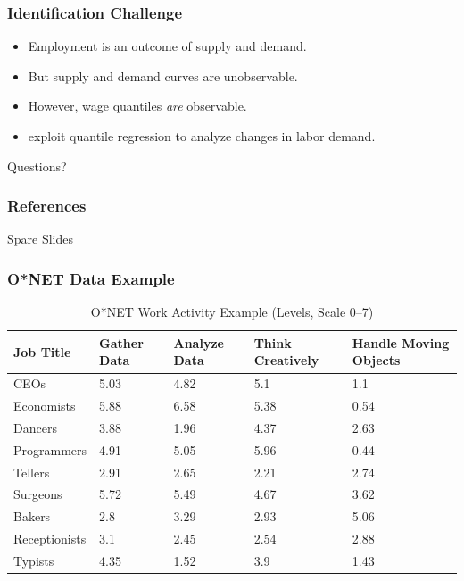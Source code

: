 \documentclass[red]{beamer}
\begin{document}
\begin{frame}
  \frametitle{Identification Challenge}
  \begin{itemize}
  \item Employment is an outcome of supply and demand.
  \item But supply and demand curves are unobservable.
  \item However, wage quantiles {\em are} observable. 
  \item \citet{Firpo2011} exploit quantile regression to analyze changes in labor demand.
  \end{itemize}
\end{frame}

\begin{frame}
  \begin{center}
    Questions?    
  \end{center}
\end{frame}

\begin{frame}
\frametitle{References}
\printbibliography
\end{frame}

\begin{frame}
  \begin{center}
    Spare Slides
  \end{center}
\end{frame}

\begin{frame}
\frametitle{O*NET Data Example}
\begin{table}[htbp]
\begin{tabular}{|p{2cm}|p{1.65cm}|p{1.5cm}|p{1.5cm}|p{1.5cm}|}
\hline
{Job Title} & {Gather Data} & {Analyze Data} & {\small Think Creatively} & {Handle Moving Objects} \\ \hline
{CEOs} & 5.03 & 4.82 & 5.1 & 1.1  \\ \hline
{Economists} & 5.88 & 6.58 & 5.38 & 0.54 \\ \hline
{Dancers} & 3.88 & 1.96 & 4.37 & 2.63 \\ \hline
{Programmers} & 4.91 & 5.05 & 5.96 & 0.44 \\ \hline
{Tellers} & 2.91 & 2.65 & 2.21 & 2.74 \\ \hline
{Surgeons} & 5.72 & 5.49 & 4.67 & 3.62 \\ \hline
{Bakers} & 2.8 & 3.29 & 2.93 & 5.06 \\ \hline
{Receptionists} & 3.1 & 2.45 & 2.54 & 2.88 \\ \hline
{Typists} & 4.35 & 1.52 & 3.9 & 1.43 \\ \hline
\end{tabular}
\caption{O*NET Work Activity Example (Levels, Scale 0--7)}
\label{onetex}
\end{table}
\end{frame}
\end{document}
